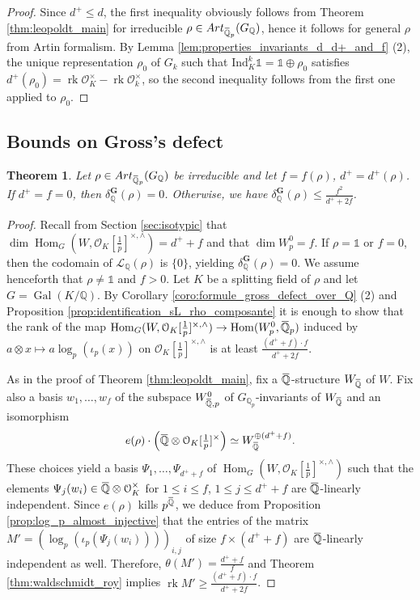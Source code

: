 \documentclass[12pt]{amsart}
\newcommand{\Q}{\mathbb{Q}}
\newcommand\bQ{\mathbb{Q}}
\newcommand\Qp{{\mathbb{Q}_p}}
\newcommand\cO{\mathcal{O}}
\newcommand\sL{\mathscr{L}}
\newcommand{\ob}[1]{\mkern 1.5mu\overline{\mkern-1.5mu#1\mkern-1.5mu}\mkern 1.5mu}
\newcommand{\Ind}{\mathrm{Ind}}
\newcommand{\Art}{\textrm{Art}}
\DeclareMathOperator{\Gal}{Gal}
\DeclareMathOperator{\Hom}{Hom}
\DeclareMathOperator{\rk}{rk}
\theoremstyle{defstyle}
\theoremstyle{thmstyle}
\newtheorem{theorem}[subsubsection]{Theorem}
\begin{document}
	\begin{proof}
		Since $d^+\leq d$, the first inequality obviously follows from Theorem \ref{thm:leopoldt_main} for irreducible $\rho\in \Art_{\ob{\bQ}_p}(G_\bQ)$, hence it follows for general $\rho$ from Artin formalism. By Lemma \ref{lem:properties_invariants_d_d+_and_f} (2), the unique representation $\rho_0$ of $G_k$ such that $\Ind_K^k \mathds{1}=\mathds{1} \oplus \rho_0$ satisfies $d^+(\rho_0)=\rk \cO_K^\times - \rk \cO_k^\times$, so the second inequality follows from the first one applied to $\rho_0$.
	\end{proof}
	\subsection{Bounds on Gross's defect}
	\begin{theorem}\label{thm:g_k_main}
		Let $\rho\in \Art_{\ob{\bQ}_p}(G_\Q)$ be irreducible and let $f=f(\rho)$, $d^+=d^+(\rho)$. If $d^+=f=0$, then $\delta_\Q^\textbf{G}(\rho)=0$. Otherwise, we have $\delta_\bQ^\textbf{G}(\rho) \leq \frac{f^2}{d^++2f}$.
	\end{theorem}
	\begin{proof}
		Recall from Section \ref{sec:isotypic} that $\dim \Hom_G(W,\cO_K[\tfrac{1}{p}]^{\times,\wedge})=d^++f$ and that $\dim W_p^0=f$. If $\rho=\mathds{1}$ or $f=0$, then the codomain of $\sL_\Q(\rho)$ is $\{0\}$, yielding $\delta_\Q^\textbf{G}(\rho)=0$. We assume henceforth that $\rho\neq \mathds{1}$ and $f>0$. Let $K$ be a splitting field of $\rho$ and let $G=\Gal(K/\Q)$. By Corollary \ref{coro:formule_gross_defect_over_Q} (2) and Proposition \ref{prop:identification_sL_rho_composante} it is enough to show that the rank of the map $\Hom_G(W,\cO_K[\tfrac{1}{p}]^{\times,\wedge})\rightarrow \Hom(W_p^0,\ob{\Q}_p)$ induced by $a\otimes x \mapsto a\log_p(\iota_p(x))$ on $\cO_K[\tfrac{1}{p}]^{\times,\wedge}$ is at least $\frac{(d^++f)\cdot f}{d^++2f}$.
		
		As in the proof of Theorem \ref{thm:leopoldt_main}, fix a $\ob{\Q}$-structure $W_{\ob{\Q}}$ of $W$. Fix also a basis $w_1,\ldots,w_f$ of the subspace $W_{\ob{\Q},p}^0$ of $G_{\Qp}$-invariants of $W_{\ob{\Q}}$ and an isomorphism 
		$$e(\rho)\cdot \left(\ob{\Q} \otimes \cO_K[\tfrac{1}{p}]^\times\right) \simeq W_{\ob{\Q}}^{\oplus (d^++f)}.$$
		 These choices yield a basis $\Psi_1,\ldots,\Psi_{d^++f}$ of $\Hom_G(W,\cO_K[\tfrac{1}{p}]^{\times,\wedge})$ such that the elements $\Psi_j(w_i) \in \ob{\bQ} \otimes \cO_K^\times$ for $1\leq i \leq f$, $1 \leq j \leq d^++f$ are $\ob{\bQ}$-linearly independent. Since $e(\rho)$ kills $p^{\ob{\Q}}$, we deduce from Proposition \ref{prop:log_p_almost_injective} that the entries of the matrix $M'=(\log_p(\iota_p(\Psi_j(w_i))))_{i,j}$ of size $f \times (d^++f)$ are $\ob{\Q}$-linearly independent as well. Therefore, $\theta(M')=\tfrac{d^++f}{f}$ and Theorem \ref{thm:waldschmidt_roy} implies $\rk M' \geq \tfrac{(d^++f)\cdot f}{d^++2f}$.
	\end{proof}
\end{document}
